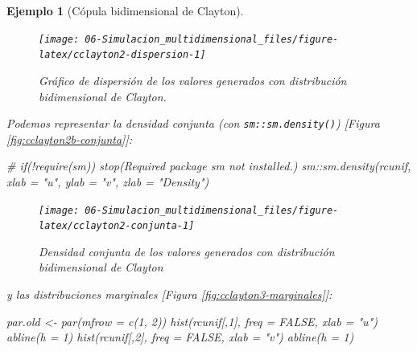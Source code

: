 \documentclass[
]{book}
\newenvironment{Shaded}{\begin{snugshade}}{\end{snugshade}}
\newcommand{\AttributeTok}[1]{\textcolor[rgb]{0.77,0.63,0.00}{#1}}
\newcommand{\CommentTok}[1]{\textcolor[rgb]{0.56,0.35,0.01}{\textit{#1}}}
\newcommand{\ConstantTok}[1]{\textcolor[rgb]{0.00,0.00,0.00}{#1}}
\newcommand{\DecValTok}[1]{\textcolor[rgb]{0.00,0.00,0.81}{#1}}
\newcommand{\FunctionTok}[1]{\textcolor[rgb]{0.00,0.00,0.00}{#1}}
\newcommand{\NormalTok}[1]{#1}
\newcommand{\OtherTok}[1]{\textcolor[rgb]{0.56,0.35,0.01}{#1}}
\newcommand{\SpecialCharTok}[1]{\textcolor[rgb]{0.00,0.00,0.00}{#1}}
\newcommand{\StringTok}[1]{\textcolor[rgb]{0.31,0.60,0.02}{#1}}
\theoremstyle{break}
\newtheorem{example}{Ejemplo}[chapter]
\theoremstyle{nonumberplain}
\begin{document}
\begin{example}[Cópula bidimensional de Clayton]
\begin{figure}[!htb]

{\centering \texttt{[image: 06-Simulacion\_multidimensional\_files/figure-latex/cclayton2-dispersion-1]} 

}

\caption{Gráfico de dispersión de los valores generados con distribución bidimensional de Clayton.}\label{fig:cclayton2-dispersion}
\end{figure}

Podemos representar la densidad conjunta (con \texttt{sm::sm.density()}) {[}Figura \ref{fig:cclayton2b-conjunta}{]}:

\begin{Shaded}
\begin{Highlighting}[]
\CommentTok{\# if(!require(sm)) stop(\textquotesingle{}Required package \textasciigrave{}sm\textasciigrave{} not installed.\textquotesingle{})}
\NormalTok{sm}\SpecialCharTok{::}\FunctionTok{sm.density}\NormalTok{(rcunif, }\AttributeTok{xlab =} \StringTok{"u"}\NormalTok{, }\AttributeTok{ylab =} \StringTok{"v"}\NormalTok{, }\AttributeTok{zlab =} \StringTok{"Density"}\NormalTok{)    }
\end{Highlighting}
\end{Shaded}

\begin{figure}[!htb]

{\centering \texttt{[image: 06-Simulacion\_multidimensional\_files/figure-latex/cclayton2-conjunta-1]} 

}

\caption{Densidad conjunta de los valores generados con distribución bidimensional de Clayton}\label{fig:cclayton2-conjunta}
\end{figure}

y las distribuciones marginales {[}Figura \ref{fig:cclayton3-marginales}{]}:

\begin{Shaded}
\begin{Highlighting}[]
\NormalTok{par.old }\OtherTok{\textless{}{-}} \FunctionTok{par}\NormalTok{(}\AttributeTok{mfrow =} \FunctionTok{c}\NormalTok{(}\DecValTok{1}\NormalTok{, }\DecValTok{2}\NormalTok{))}
\FunctionTok{hist}\NormalTok{(rcunif[,}\DecValTok{1}\NormalTok{], }\AttributeTok{freq =} \ConstantTok{FALSE}\NormalTok{, }\AttributeTok{xlab =} \StringTok{"u"}\NormalTok{)}
\FunctionTok{abline}\NormalTok{(}\AttributeTok{h =} \DecValTok{1}\NormalTok{)}
\FunctionTok{hist}\NormalTok{(rcunif[,}\DecValTok{2}\NormalTok{], }\AttributeTok{freq =} \ConstantTok{FALSE}\NormalTok{, }\AttributeTok{xlab =} \StringTok{"v"}\NormalTok{)}
\FunctionTok{abline}\NormalTok{(}\AttributeTok{h =} \DecValTok{1}\NormalTok{)}
\end{Highlighting}
\end{Shaded}


\end{example}
\end{document}
